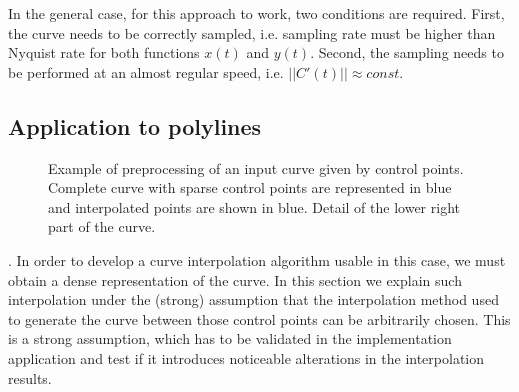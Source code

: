 \documentclass{ipol}
\newcommand{\chapFiveDir}{images/chapter_05a}
\begin{document}
In the general case, for this approach to work, two conditions are required. First, the curve needs to be correctly sampled, i.e. sampling rate must be higher than Nyquist rate for both functions $x(t)$ and $y(t)$.
Second, the sampling needs to be performed at an almost regular speed, i.e. $||C'(t)|| \approx const.$

\subsection{Application to polylines}\label{sec:curve_interpolation:curve_reconstruction:polylines}

\begin{figure}[h]
	\centering
	\caption{Example of preprocessing of an input curve given by control points. 
		\protect{} Complete curve with sparse control points are represented in blue and interpolated points are shown in blue.
		\protect{} Detail of the lower right part of the curve.
	}
	\label{fig:curve_interpolation:control_points}
\end{figure}

. In order to develop a curve interpolation algorithm usable in this case, we must obtain a dense representation of the curve. In this section we explain such interpolation under the (strong) assumption that the interpolation method used to generate  the curve between those control points can be arbitrarily chosen. This is a strong assumption, which has to be validated in the implementation application and test if it introduces noticeable alterations in the interpolation results.
\end{document}
